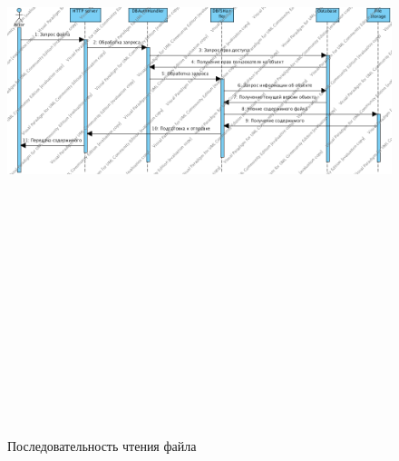 \documentclass[utf8,usehyperref,12pt]{G7-32}
\begin{document}
\begin{figure}[h]
   \centering%
   \includegraphics[height=200mm, width=1\textwidth, angle=90, clip, keepaspectratio]{pictures/get_seq}
   \caption{Последовательность чтения файла}\label{fig:get_seq}
 \end{figure}
\end{document}

